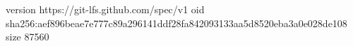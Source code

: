version https://git-lfs.github.com/spec/v1
oid sha256:aef896beae7e777c89a296141ddf28fa842093133aa5d8520eba3a0e028de108
size 87560
